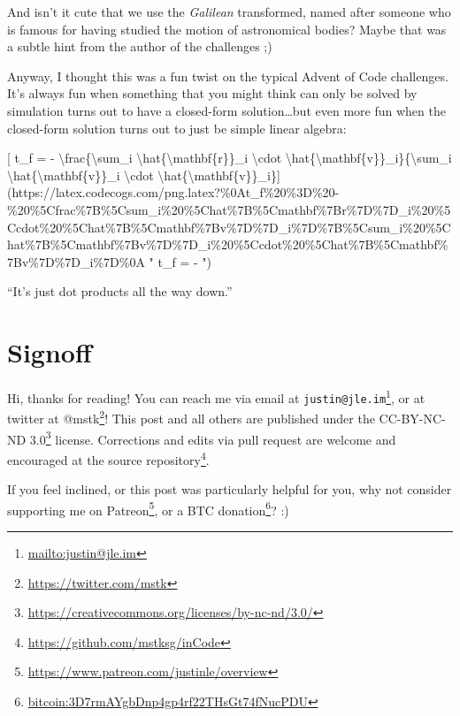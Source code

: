 \documentclass[]{article}
\renewcommand{\href}[2]{#2\footnote{\url{#1}}}
\begin{document}
And isn't it cute that we use the \emph{Galilean} transformed, named after
someone who is famous for having studied the motion of astronomical bodies?
Maybe that was a subtle hint from the author of the challenges ;)

Anyway, I thought this was a fun twist on the typical Advent of Code challenges.
It's always fun when something that you might think can only be solved by
simulation turns out to have a closed-form solution\ldots{}but even more fun
when the closed-form solution turns out to just be simple linear algebra:

{[} t\_f = - \textbackslash{}frac\{\textbackslash{}sum\_i
\textbackslash{}hat\{\textbackslash{}mathbf\{r\}\}\_i \textbackslash{}cdot
\textbackslash{}hat\{\textbackslash{}mathbf\{v\}\}\_i\}\{\textbackslash{}sum\_i
\textbackslash{}hat\{\textbackslash{}mathbf\{v\}\}\_i \textbackslash{}cdot
\textbackslash{}hat\{\textbackslash{}mathbf\{v\}\}\_i\}{]}(https://latex.codecogs.com/png.latex?\%0At\_f\%20\%3D\%20-\%20\%5Cfrac\%7B\%5Csum\_i\%20\%5Chat\%7B\%5Cmathbf\%7Br\%7D\%7D\_i\%20\%5Ccdot\%20\%5Chat\%7B\%5Cmathbf\%7Bv\%7D\%7D\_i\%7D\%7B\%5Csum\_i\%20\%5Chat\%7B\%5Cmathbf\%7Bv\%7D\%7D\_i\%20\%5Ccdot\%20\%5Chat\%7B\%5Cmathbf\%7Bv\%7D\%7D\_i\%7D\%0A
" t\_f = -
")

``It's just dot products all the way down.''

\hypertarget{signoff}{%
\section{Signoff}\label{signoff}}

Hi, thanks for reading! You can reach me via email at
\href{mailto:justin@jle.im}{\nolinkurl{justin@jle.im}}, or at twitter at
\href{https://twitter.com/mstk}{@mstk}! This post and all others are published
under the \href{https://creativecommons.org/licenses/by-nc-nd/3.0/}{CC-BY-NC-ND
3.0} license. Corrections and edits via pull request are welcome and encouraged
at \href{https://github.com/mstksg/inCode}{the source repository}.

If you feel inclined, or this post was particularly helpful for you, why not
consider \href{https://www.patreon.com/justinle/overview}{supporting me on
Patreon}, or a \href{bitcoin:3D7rmAYgbDnp4gp4rf22THsGt74fNucPDU}{BTC donation}?
:)
\end{document}
